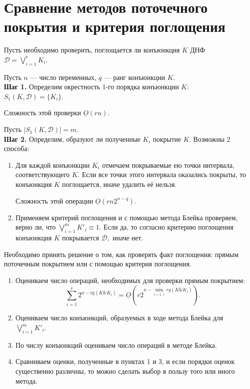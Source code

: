 \documentclass[12pt,a4paper,oneside,fleqn,leqno]{article}
\theoremstyle{definition}
\begin{document}
	\section{Сравнение методов поточечного покрытия и критерия поглощения}
		Пусть необходимо проверить, поглощается ли конъюнкция $K$ ДНФ $\mathcal{D} = \bigvee\limits_{i = 1}^r K_i.$\par
		Пусть $n$ --- число переменных, $q$ --- ранг конъюнкции $K.$\\
		\textbf{Шаг 1.} Определим окрестность 1-го порядка конъюнкции $K$: $S_1(K, \mathcal{D}) = \{K_i\}.$\par
		Сложность этой проверки $\underline{O}(rn).$\par
		Пусть $|S_1(K, \mathcal{D})| = m$.\\
		\textbf{Шаг 2.} Определим, образуют ли полученные $K_i$ покрытие $K.$ Возможны 2 способа:\par
		\begin{enumerate}
			\item
			Для каждой конъюнкции $K_i$ отмечаем покрываемые ею точки интервала, соответствующего $K.$ Если все точки этого интервала оказались покрыты, то конъюнкция $K$ поглощается, иначе удалить её нельзя.\par
			Сложность этой операции $\underline{O}(rn2^{n-q})$.
			\item
			Применяем критерий поглощения и с помощью метода Блейка проверяем, верно ли, что $\bigvee\limits_{i = 1}^m K'_i \equiv 1.$ Если да, то согласно критерию поглощения конъюнкция $K$ покрывается $\mathcal{D},$ иначе нет.\par
		\end{enumerate}\par
		Необходимо принять решение о том, как проверять факт поглощения: прямым поточечным покрытием или с помощью критерия поглощения.
		\begin{enumerate}
			\item
			Оцениваем число операций, необходимых для проверки прямым покрытием:
			$$
				\sum_{i = 1}^r 2^{n-\text{rg}(K \& K_i)} = \underline{O}\left(r 2^{n - \min\limits_{i = \overline{1,\,r}}rg(K \& K_i)}\right).
			$$
			\item
			Оцениваем число конъюнкций, образуемых в ходе метода Блейка для $\bigvee\limits_{i = 1}^m K'_i$.
			\item
			По числу конъюнкций оцениваем число операций в методе Блейка.
			\item
			Сравниваем оценки, полученные в пунктах 1 и 3, и если порядки оценок существенно различны, то можно сделать выбор в пользу того или иного метода.
		\end{enumerate}
\end{document}
